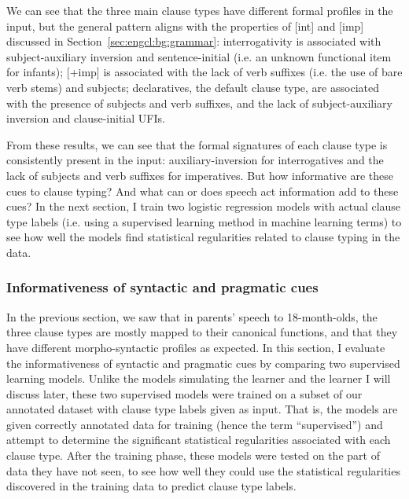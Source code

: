 We can see that the three main clause types have different formal profiles in the input, but the general pattern aligns with the properties of [\textpm int] and [\textpm imp] discussed in Section~\ref{sec:engcl:bg:grammar}: interrogativity is associated with subject-auxiliary inversion and sentence-initial \twh{} (i.e. an unknown functional item for infants); [+imp] is associated with the lack of verb suffixes (i.e. the use of bare verb stems) and subjects; declaratives, the default clause type, are associated with the presence of subjects and verb suffixes, and the lack of subject-auxiliary inversion and clause-initial UFIs. 

From these results, we can see that the formal signatures of each clause type is consistently present in the input: auxiliary-inversion for interrogatives and the lack of subjects and verb suffixes for imperatives. But how informative are these cues to clause typing? And what can or does speech act information add to these cues? In the next section, I train two logistic regression models with actual clause type labels (i.e. using a supervised learning method in machine learning terms) to see how well the models find statistical regularities related to clause typing in the data. 


\subsubsection{Informativeness of syntactic and pragmatic cues}
\label{sec:engcl:corpus:supervised}
In the previous section, we saw that in parents' speech to 18-month-olds, the three clause types are mostly mapped to their canonical functions, and that they have different morpho-syntactic profiles as expected. In this section, I evaluate the informativeness of syntactic and pragmatic cues by comparing two supervised learning models. Unlike the models simulating the \dlearnerabbr{} learner and the \plearnerabbr{} learner I will discuss later, these two supervised models were trained on a subset of our annotated dataset with clause type labels given as input. That is, the models are given correctly annotated data for training (hence the term ``supervised'') and attempt to determine the significant statistical regularities associated with each clause type. After the training phase, these models were tested on the part of data they have not seen, to see how well they could use the statistical regularities discovered in the training data to predict clause type labels. 

